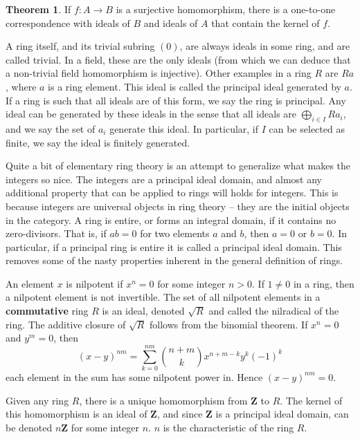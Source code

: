 \documentclass[12pt]{amsbook}
\theoremstyle{definition}
\newtheorem{theorem}{Theorem}[chapter]
\begin{document}
\begin{theorem}
    If $f:A \to B$ is a surjective homomorphism, there is a one-to-one correspondence with ideals of $B$ and ideals of $A$ that contain the kernel of $f$.
\end{theorem}

A ring itself, and its trivial subring $(0)$, are always ideals in some ring, and are called trivial. In a field, these are the only ideals (from which we can deduce that a non-trivial field homomorphism is injective). Other examples in a ring $R$ are $Ra$, where $a$ is a ring element. This ideal is called the principal ideal generated by $a$. If a ring is such that all ideals are of this form, we say the ring is principal. Any ideal can be generated by these ideals in the sense that all ideals are $\bigoplus_{i \in I} Ra_i$, and we say the set of $a_i$ generate this ideal. In particular, if $I$ can be selected as finite, we say the ideal is finitely generated.

Quite a bit of elementary ring theory is an attempt to generalize what makes the integers so nice. The integers are a principal ideal domain, and almost any additional property that can be applied to rings will holds for integers. This is because integers are universal objects in ring theory -- they are the initial objects in the category. A ring is entire, or forms an integral domain, if it contains no zero-divisors. That is, if $ab = 0$ for two elements $a$ and $b$, then $a = 0$ or $b = 0$. In particular, if a principal ring is entire it is called a principal ideal domain. This removes some of the nasty properties inherent in the general definition of rings.

An element $x$ is nilpotent if $x^n = 0$ for some integer $n > 0$. If $1 \neq 0$ in a ring, then a nilpotent element is not invertible. The set of all nilpotent elements in a {\bf commutative} ring $R$ is an ideal, denoted $\sqrt{R}$ and called the nilradical of the ring. The additive closure of $\sqrt{R}$ follows from the binomial theorem. If $x^n = 0$ and $y^m = 0$, then
%
\[ (x - y)^{nm} = \sum_{k = 0}^{nm} {n + m \choose k} x^{n + m - k}y^k (-1)^k \]
%
each element in the sum has some nilpotent power in. Hence $(x - y)^{nm} = 0$.

Given any ring $R$, there is a unique homomorphism from $\mathbf{Z}$ to $R$. The kernel of this homomorphism is an ideal of $\mathbf{Z}$, and since $\mathbf{Z}$ is a principal ideal domain, can be denoted $n\mathbf{Z}$ for some integer $n$. $n$ is the characteristic of the ring $R$.
\end{document}
